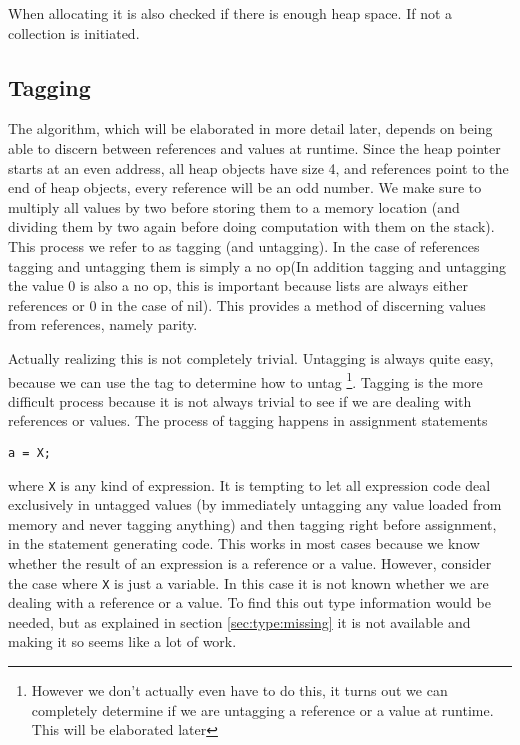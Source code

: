 \documentclass{scrartcl}
\begin{document}
When allocating it is also checked if there is enough heap space.
If not a collection is initiated.

\subsection{Tagging}

The algorithm, which will be elaborated in more detail later, 
 depends on being able to discern between references and
values at runtime. Since the heap pointer starts at an even address, 
all heap objects have size 4, and references point to the end of heap
objects, every reference will be an odd number. We make sure to multiply
all values by two before storing them to a memory location (and 
dividing them by two again before doing computation with them on the
stack). This process we refer to as tagging (and untagging). In the
case of references tagging and untagging them is simply a no op(In
addition tagging and untagging the value 0 is also a no op, this is 
important because lists are always either references or 0 in the case
of nil).
This provides a method of discerning values from references, namely
parity. 

Actually realizing this is not completely trivial. Untagging is always
quite easy, because we can use the tag to determine how to untag
\footnote{However we don't actually even have to do this, it turns
out we can completely determine if we are untagging a reference or a 
value at runtime. This will be elaborated later}. Tagging is the more
difficult process because it is not always trivial to see if we are
dealing with references or values. The process of
tagging happens in assignment statements
\begin{lstlisting}
a = X;
\end{lstlisting}
where \lstinline{X} is any kind of expression. It is tempting to 
let all expression code deal exclusively in untagged values (by 
immediately untagging any value loaded from memory and never tagging
anything) and then
tagging right before assignment, in the statement generating code.
This works in most cases because we know whether the result of an 
expression is a reference or a value. However, consider the case where
\lstinline{X} is just a variable. In this case it is not known whether
we are dealing with a reference or a value. To find this out type
information would be needed, but as explained in section \ref{sec:type:missing}
it is not available and making it so seems like a lot of work.
\end{document}
